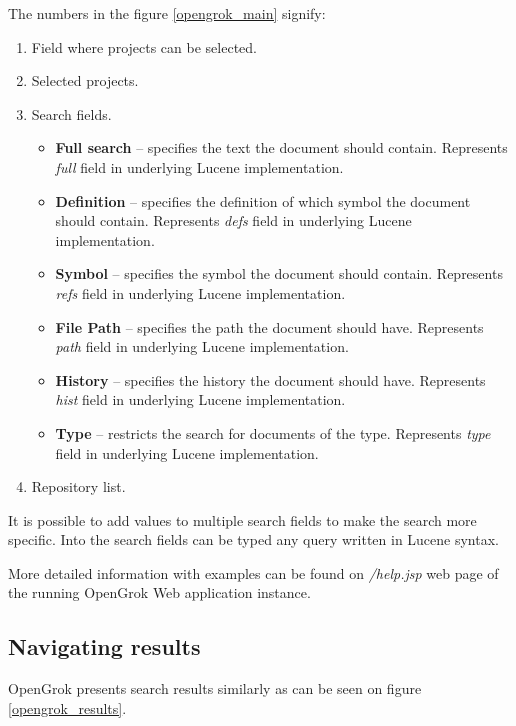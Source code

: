 The numbers in the figure \ref{opengrok_main} signify:
\begin{enumerate}
    \item Field where projects can be selected.
    \item Selected projects.
    \item Search fields.
       \begin{itemize}
        \item \textbf{Full search} – specifies the text the document should contain. Represents \textit{full} field in
        underlying Lucene implementation.
        \item \textbf{Definition} – specifies the definition of which symbol the document should contain.
        Represents \textit{defs} field in underlying Lucene implementation.
        \item \textbf{Symbol} – specifies the symbol the document should contain.
        Represents \textit{refs} field in underlying Lucene implementation.
        \item \textbf{File Path} – specifies the path the document should have.
        Represents \textit{path} field in underlying Lucene implementation.
        \item \textbf{History} – specifies the history the document should have.
        Represents \textit{hist} field in underlying Lucene implementation.
        \item \textbf{Type} – restricts the search for documents of the type.
        Represents \textit{type} field in underlying Lucene implementation.
       \end{itemize}
    \item Repository list.
\end{enumerate}

It is possible to add values to multiple search fields to make the search more specific. Into the search fields can be
typed any query written in Lucene syntax.

More detailed information with examples can be found on \textit{/help.jsp} web page of the running OpenGrok Web application instance.

\subsection{Navigating results}

OpenGrok presents search results similarly as can be seen on figure \ref{opengrok_results}.

